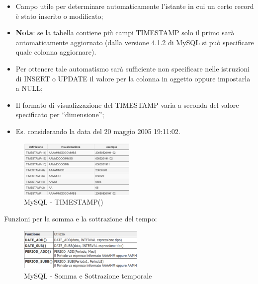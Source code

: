 \begin{itemize}

\item Campo utile per determinare automaticamente l’istante in cui un certo record è stato inserito o modificato;
\item\textbf{Nota}: se la tabella contiene più campi TIMESTAMP solo il primo sarà automaticamente aggiornato (dalla versione 4.1.2 di MySQL si può specificare quale colonna aggiornare).
\item Per ottenere tale automatismo sarà sufficiente non specificare nelle istruzioni di INSERT o UPDATE il valore per la colonna in oggetto oppure impostarla a NULL;
\item Il formato di visualizzazione del TIMESTAMP varia a seconda del valore specificato per “dimensione”;
\item Es. considerando la data del 20 maggio 2005 19:11:02.

\end{itemize}

\begin{center}
\begin{figure}[H]
\centering
\includegraphics[scale=1]{figures/mySQL_timestamp.png}
\caption{MySQL - TIMESTAMP()} 
\end{figure}
\end{center}

Funzioni per la somma e la sottrazione del tempo:

\begin{center}
\begin{figure}[H]
\centering
\includegraphics[scale=1]{figures/mySQL_addsubdate.png}
\caption{MySQL - Somma e Sottrazione temporale} 
\end{figure}
\end{center}

